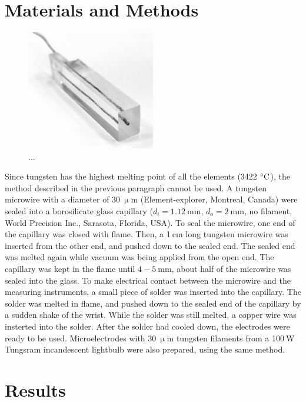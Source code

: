 \documentclass[manuscript=article, journal=jceda8]{achemso}
\begin{document}
\section{Materials and Methods}


\begin{figure}[!h]
\centering
\includegraphics[width=0.5\textwidth]{img/plexi.jpg}
\caption{...}
\label{fig:plexi}
\end{figure}

Since tungsten has the highest melting point of all the elements (3422 $\celsius$), the method described in the previous paragraph cannot be used.
A tungsten microwire with a diameter of $30~\upmu$m (Element-explorer, Montreal, Canada) were sealed into a borosilicate glass capillary ($d_i=1.12~$mm, $d_o=2~$mm, no filament, World Precision Inc., Sarasota, Florida, USA).
To seal the microwire, one end of the capillary was closed with flame.
Then, a 1$~$cm long tungsten microwire was inserted from the other end, and pushed down to the sealed end.
The sealed end was melted again while vacuum was being applied from the open end.
The capillary was kept in the flame until $4-5~$mm, about half of the microwire was sealed into the glass.
To make electrical contact between the microwire and the measuring instruments, a small piece of solder was inserted into the capillary.
The solder was melted in flame, and pushed down to the sealed end of the capillary by a sudden shake of the wrist.
While the solder was still melted, a copper wire was insterted into the solder.
After the solder had cooled down, the electrodes were ready to be used.
Microelectrodes with $30~\upmu$m tungsten filaments from a 100$~$W Tungsram incandescent lightbulb were also prepared, using the same method.




\section{Results}
\end{document}
